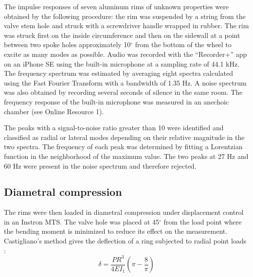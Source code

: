 \documentclass[../thesis.tex]{subfiles}
\begin{document}

The impulse responses of seven aluminum rims of unknown properties were obtained by the following procedure: the rim was suspended by a string from the valve stem hole and struck with a screwdriver handle wrapped in rubber. The rim was struck first on the inside circumference and then on the sidewall at a point between two spoke holes approximately 10$^{\circ}$ from the bottom of the wheel to excite as many modes as possible. Audio was recorded with the ``Recorder+'' app on an iPhone SE using the built-in microphone at a sampling rate of 44.1 kHz. The frequency spectrum was estimated by averaging eight spectra calculated using the Fast Fourier Transform with a bandwidth of 1.35 Hz. A noise spectrum was also obtained by recording several seconds of silence in the same room. The frequency response of the built-in microphone was measured in an anechoic chamber (see Online Resource 1).

The peaks with a signal-to-noise ratio greater than 10 were identified and classified as radial or lateral modes depending on their relative magnitude in the two spectra. The frequency of each peak was determined by fitting a Lorentzian function in the neighborhood of the maximum value. The two peaks at 27 Hz and 60 Hz were present in the noise spectrum and therefore rejected.

\subsection{Diametral compression}
The rims were then loaded in diametral compression under displacement control in an Instron MTS. The valve hole was placed at 45$^{\circ}$ from the load point where the bending moment is minimized to reduce its effect on the measurement. Castigliano's method gives the deflection of a ring subjected to radial point loads \cite{Timoshenko1961a}:
  \begin{equation}\label{eq:def_rad}
  \delta = \frac{PR^3}{4EI_1} \left(\pi-\frac{8}{\pi} \right)
  \end{equation}
\end{document}
